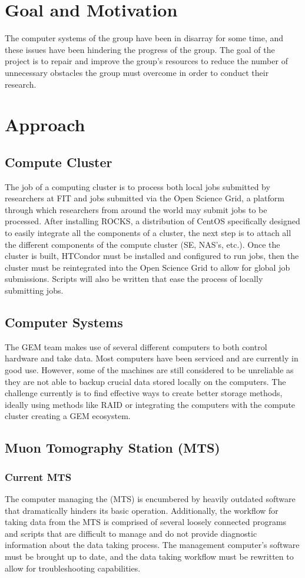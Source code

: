 \documentclass[12pt]{article}
\newcommand\tab[1][1cm]{\hspace*{#1}}
\begin{document}
\section{Goal and Motivation}
\tab The computer systems of the group have been in disarray for
some time, and these issues have been hindering the progress of
the group. The goal of the project is to repair and improve the
group’s resources to reduce the number of unnecessary obstacles
the group must overcome in order to conduct their research.

\section{Approach}
	\subsection{Compute Cluster}
\tab The job of a computing cluster is to process both local jobs
submitted by researchers at FIT and jobs submitted via the Open
Science Grid, a platform through which researchers from around
the world may submit jobs to be processed. After installing
ROCKS, a distribution of CentOS specifically designed to easily
integrate all the components of a cluster, the next
step is to attach all the different components
of the compute cluster (SE, NAS's, etc.). Once the cluster is built,
HTCondor must be installed and configured to run jobs, then the
cluster must be reintegrated into the Open Science Grid to allow
for global job submissions. Scripts will also be written that ease
the process of locally submitting jobs.
	\subsection{Computer Systems}
		\tab The GEM team makes use of several different computers to
		both control hardware and take data. Most computers have been serviced
		and are currently in good use. However, some of the machines are
		still considered to be unreliable as they are not able to backup
		crucial data stored locally on the computers. The challenge currently
		is to find effective ways to create better storage methods, ideally
		using methods like RAID or integrating the computers with the compute
		cluster creating a GEM ecosystem.
	\subsection{Muon Tomography Station (MTS)}
		\subsubsection{Current MTS}
\tab The computer managing the (MTS) is encumbered by heavily outdated software that dramatically hinders its basic operation. Additionally, the workflow for taking data from the MTS is
comprised of several loosely connected programs and scripts that
are difficult to manage and do not provide diagnostic information
about the data taking process. The management computer’s software must be brought up to date, and the data taking workflow must be rewritten to allow for troubleshooting capabilities.
\end{document}
